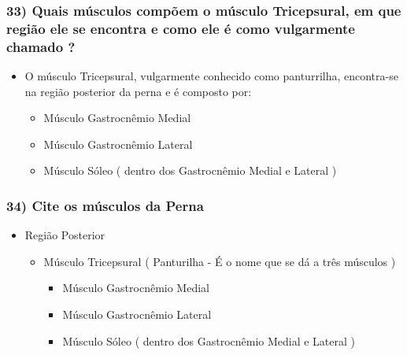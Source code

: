 \documentclass[
]{book}
\providecommand{\tightlist}{%
  \setlength{\itemsep}{0pt}\setlength{\parskip}{0pt}}
\begin{document}
\hypertarget{quais-muxfasculos-compuxf5em-o-muxfasculo-tricepsural-em-que-regiuxe3o-ele-se-encontra-e-como-ele-uxe9-como-vulgarmente-chamado}{%
\subsubsection*{33) Quais músculos compõem o músculo Tricepsural, em que região ele se encontra e como ele é como vulgarmente chamado ?}\label{quais-muxfasculos-compuxf5em-o-muxfasculo-tricepsural-em-que-regiuxe3o-ele-se-encontra-e-como-ele-uxe9-como-vulgarmente-chamado}}

\begin{itemize}
\tightlist
\item
  O músculo Tricepsural, vulgarmente conhecido como panturrilha, encontra-se na região posterior da perna e é composto por:

  \begin{itemize}
  \tightlist
  \item
    Músculo Gastrocnêmio Medial
  \item
    Músculo Gastrocnêmio Lateral
  \item
    Músculo Sóleo ( dentro dos Gastrocnêmio Medial e Lateral )
  \end{itemize}
\end{itemize}

\hypertarget{cite-os-muxfasculos-da-perna}{%
\subsubsection*{34) Cite os músculos da Perna}\label{cite-os-muxfasculos-da-perna}}

\begin{itemize}
\tightlist
\item
  Região Posterior

  \begin{itemize}
  \tightlist
  \item
    Músculo Tricepsural ( Panturilha - É o nome que se dá a três músculos )

    \begin{itemize}
    \tightlist
    \item
      Músculo Gastrocnêmio Medial
    \item
      Músculo Gastrocnêmio Lateral
    \item
      Músculo Sóleo ( dentro dos Gastrocnêmio Medial e Lateral )
    \end{itemize}
  \end{itemize}
\end{itemize}
\end{document}
